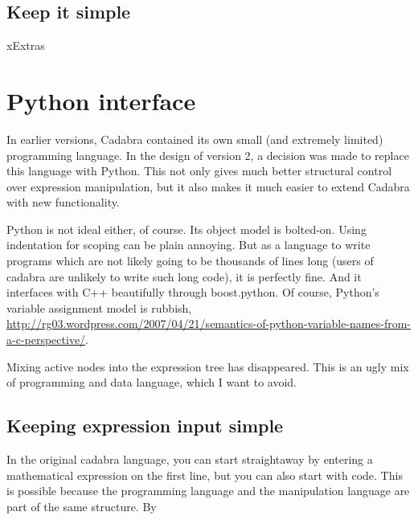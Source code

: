 \documentclass[11pt]{article}
\begin{document}
\subsection{Keep it simple}


xExtras



%

\section{Python interface}

In earlier versions, Cadabra contained its own small (and extremely
limited) programming language. In the design of version 2, a decision
was made to replace this language with Python. This not only gives
much better structural control over expression manipulation, but it
also makes it much easier to extend Cadabra with new functionality.

Python is not ideal either, of course. Its object model is bolted-on.
Using indentation for scoping can be plain annoying.  But as a
language to write programs which are not likely going to be thousands
of lines long (users of cadabra are unlikely to write such long code),
it is perfectly fine. And it interfaces with C++ beautifully through
boost.python. Of course, Python's variable assignment model is
rubbish,
\url{http://rg03.wordpress.com/2007/04/21/semantics-of-python-variable-names-from-a-c-perspective/}.

Mixing active nodes into the expression tree has disappeared. This is
an ugly mix of programming and data language, which I want to avoid.


\subsection{Keeping expression input simple}

In the original cadabra language, you can start straightaway by
entering a mathematical expression on the first line, but you can also
start with code.  This is possible because the programming language
and the manipulation language are part of the same structure. By
\end{document}
